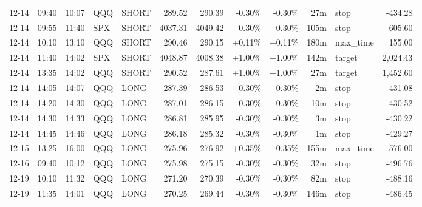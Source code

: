 \documentclass[11pt,a4paper,twoside]{article}
\begin{document}
\begin{center}
\begin{longtable}{>{\color{txtmain}}l l l l l r r r r r >{\color{txtmain}}l r}
12-14 & 09:40 & 10:07 & QQQ & SHORT & 289.52 & 290.39 & \textcolor{lossred}{-0.30\%} & \textcolor{lossred}{-0.30\%} & 27m & stop & \textcolor{lossred}{-434.28} \\
12-14 & 09:55 & 11:40 & SPX & SHORT & 4037.31 & 4049.42 & \textcolor{lossred}{-0.30\%} & \textcolor{lossred}{-0.30\%} & 105m & stop & \textcolor{lossred}{-605.60} \\
12-14 & 10:10 & 13:10 & QQQ & SHORT & 290.46 & 290.15 & \textcolor{wingreen}{+0.11\%} & \textcolor{wingreen}{+0.11\%} & 180m & max\_time & \textcolor{wingreen}{155.00} \\
12-14 & 11:40 & 14:02 & SPX & SHORT & 4048.87 & 4008.38 & \textcolor{wingreen}{+1.00\%} & \textcolor{wingreen}{+1.00\%} & 142m & target & \textcolor{wingreen}{2,024.43} \\
12-14 & 13:35 & 14:02 & QQQ & SHORT & 290.52 & 287.61 & \textcolor{wingreen}{+1.00\%} & \textcolor{wingreen}{+1.00\%} & 27m & target & \textcolor{wingreen}{1,452.60} \\
12-14 & 14:05 & 14:07 & QQQ & LONG & 287.39 & 286.53 & \textcolor{lossred}{-0.30\%} & \textcolor{lossred}{-0.30\%} & 2m & stop & \textcolor{lossred}{-431.08} \\
12-14 & 14:20 & 14:30 & QQQ & LONG & 287.01 & 286.15 & \textcolor{lossred}{-0.30\%} & \textcolor{lossred}{-0.30\%} & 10m & stop & \textcolor{lossred}{-430.52} \\
12-14 & 14:30 & 14:33 & QQQ & LONG & 286.81 & 285.95 & \textcolor{lossred}{-0.30\%} & \textcolor{lossred}{-0.30\%} & 3m & stop & \textcolor{lossred}{-430.22} \\
12-14 & 14:45 & 14:46 & QQQ & LONG & 286.18 & 285.32 & \textcolor{lossred}{-0.30\%} & \textcolor{lossred}{-0.30\%} & 1m & stop & \textcolor{lossred}{-429.27} \\
12-15 & 13:25 & 16:00 & QQQ & LONG & 275.96 & 276.92 & \textcolor{wingreen}{+0.35\%} & \textcolor{wingreen}{+0.35\%} & 155m & max\_time & \textcolor{wingreen}{576.00} \\
12-16 & 09:40 & 10:12 & QQQ & LONG & 275.98 & 275.15 & \textcolor{lossred}{-0.30\%} & \textcolor{lossred}{-0.30\%} & 32m & stop & \textcolor{lossred}{-496.76} \\
12-19 & 10:10 & 11:32 & QQQ & LONG & 271.20 & 270.39 & \textcolor{lossred}{-0.30\%} & \textcolor{lossred}{-0.30\%} & 82m & stop & \textcolor{lossred}{-488.16} \\
12-19 & 11:35 & 14:01 & QQQ & LONG & 270.25 & 269.44 & \textcolor{lossred}{-0.30\%} & \textcolor{lossred}{-0.30\%} & 146m & stop & \textcolor{lossred}{-486.45} \\

\end{longtable}
\end{center}
\end{document}
